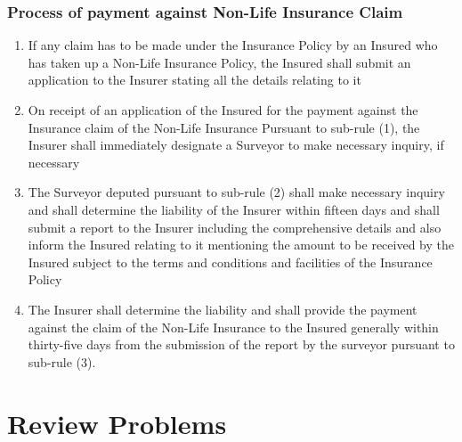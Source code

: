 \subsubsection{Process of payment against Non-Life Insurance Claim}
\begin{enumerate}
	\item  If any claim has to be made under the Insurance Policy by an Insured who has taken up a Non-Life Insurance Policy, the Insured shall submit an application to the Insurer stating all the details relating to it
	\item On receipt of an application of the Insured for the payment against the Insurance claim of the Non-Life Insurance Pursuant to sub-rule (1), the Insurer shall immediately designate a Surveyor to make necessary inquiry, if necessary
	\item The Surveyor deputed pursuant to sub-rule (2) shall make necessary inquiry and shall determine the liability of the Insurer within fifteen days and shall submit a report to the Insurer including the comprehensive details and also inform the Insured relating to it mentioning the amount to be received by the Insured subject to the terms and conditions
	and facilities of the Insurance Policy
	\item The Insurer shall determine the liability and shall provide the payment against the claim of the Non-Life Insurance to the Insured generally within thirty-five days from the submission of the report by the surveyor pursuant to sub-rule (3).
\end{enumerate}
%
\section{Review Problems}